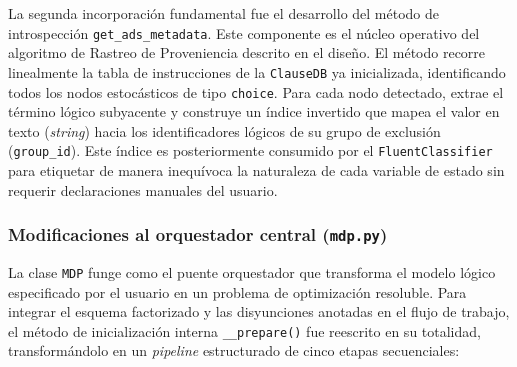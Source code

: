 La segunda incorporación fundamental fue el desarrollo del método de introspección \texttt{get\_ads\_metadata}. Este componente es el núcleo operativo del algoritmo de Rastreo de Proveniencia descrito en el diseño. El método recorre linealmente la tabla de instrucciones de la \texttt{ClauseDB} ya inicializada, identificando todos los nodos estocásticos de tipo \texttt{choice}. Para cada nodo detectado, extrae el término lógico subyacente y construye un índice invertido que mapea el valor en texto (\textit{string}) hacia los identificadores lógicos de su grupo de exclusión (\texttt{group\_id}). Este índice es posteriormente consumido por el \texttt{FluentClassifier} para etiquetar de manera inequívoca la naturaleza de cada variable de estado sin requerir declaraciones manuales del usuario.

\subsubsection{Modificaciones al orquestador central (\texttt{mdp.py})}
\label{sec:di-mdp}

La clase \texttt{MDP} funge como el puente orquestador que transforma el modelo lógico especificado por el usuario en un problema de optimización resoluble. Para integrar el esquema factorizado y las disyunciones anotadas en el flujo de trabajo, el método de inicialización interna \texttt{\_\_prepare()} fue reescrito en su totalidad, transformándolo en un \textit{pipeline} estructurado de cinco etapas secuenciales:

